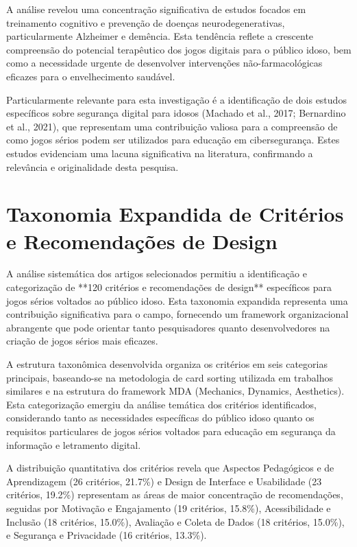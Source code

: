 A análise revelou uma concentração significativa de estudos focados em treinamento cognitivo e prevenção de doenças neurodegenerativas, particularmente Alzheimer e demência. Esta tendência reflete a crescente compreensão do potencial terapêutico dos jogos digitais para o público idoso, bem como a necessidade urgente de desenvolver intervenções não-farmacológicas eficazes para o envelhecimento saudável.

Particularmente relevante para esta investigação é a identificação de dois estudos específicos sobre segurança digital para idosos (Machado et al., 2017; Bernardino et al., 2021), que representam uma contribuição valiosa para a compreensão de como jogos sérios podem ser utilizados para educação em cibersegurança. Estes estudos evidenciam uma lacuna significativa na literatura, confirmando a relevância e originalidade desta pesquisa.

\section{Taxonomia Expandida de Critérios e Recomendações de Design}
\label{sec:taxonomia_expandida}

A análise sistemática dos artigos selecionados permitiu a identificação e categorização de **120 critérios e recomendações de design** específicos para jogos sérios voltados ao público idoso. Esta taxonomia expandida representa uma contribuição significativa para o campo, fornecendo um framework organizacional abrangente que pode orientar tanto pesquisadores quanto desenvolvedores na criação de jogos sérios mais eficazes.

A estrutura taxonômica desenvolvida organiza os critérios em seis categorias principais, baseando-se na metodologia de card sorting utilizada em trabalhos similares e na estrutura do framework MDA (Mechanics, Dynamics, Aesthetics). Esta categorização emergiu da análise temática dos critérios identificados, considerando tanto as necessidades específicas do público idoso quanto os requisitos particulares de jogos sérios voltados para educação em segurança da informação e letramento digital.

A distribuição quantitativa dos critérios revela que Aspectos Pedagógicos e de Aprendizagem (26 critérios, 21.7\%) e Design de Interface e Usabilidade (23 critérios, 19.2\%) representam as áreas de maior concentração de recomendações, seguidas por Motivação e Engajamento (19 critérios, 15.8\%), Acessibilidade e Inclusão (18 critérios, 15.0\%), Avaliação e Coleta de Dados (18 critérios, 15.0\%), e Segurança e Privacidade (16 critérios, 13.3\%).

